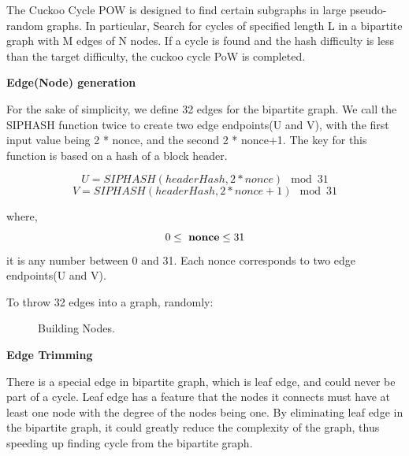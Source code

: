 \documentclass[a4paper,11pt]{article}
\begin{document}
The Cuckoo Cycle POW is designed to find certain subgraphs in large pseudo-random graphs. In particular, Search for cycles of specified length L in a bipartite graph with M edges of N nodes. If a cycle is found and the hash difficulty is less than the target difficulty, the cuckoo cycle PoW is completed.




\textbf{Edge(Node) generation}

For the sake of simplicity, we define 32 edges for the bipartite graph. We call the SIPHASH function twice to create two edge endpoints(U and V), with the first input value being 2 * nonce, and the second 2 * nonce+1. The key for this function is based on a hash of a block header.

\begin{equation}
{U = SIPHASH(headerHash, 2*nonce) \mod 31}
\end{equation}
\begin{equation}
{V = SIPHASH(headerHash, 2*nonce+1) \mod 31}
\end{equation}

where,
\begin{equation}
0\leq\ {\bf nonce} \leq 31
\end{equation}it is any number between 0 and 31. Each nonce corresponds to two edge endpoints(U and V).

To throw 32 edges into a graph, randomly:

\begin{figure}[ht]
	\centerline{%
	}
	\caption{Building Nodes.}
\end{figure}


\textbf{Edge Trimming}

There is a special edge in bipartite graph, which is leaf edge, and could never be part of a cycle. Leaf edge has a feature that the nodes it connects must have at least one node with the degree of the nodes being one. By eliminating leaf edge in the bipartite graph, it could greatly reduce the complexity of the graph, thus speeding up finding cycle from the bipartite graph.
\end{document}
